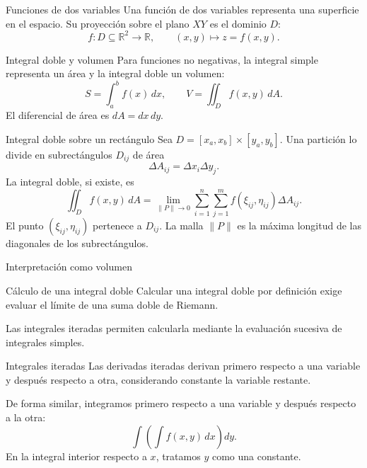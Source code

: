 \documentclass[main.tex]{subfiles}
\begin{document}
\graphicspath{{imagenes/tema5/}{../imagenes/tema5/}}



\begin{frame}{Funciones de dos variables}
Una función de dos variables representa una superficie en el espacio. Su proyección sobre el plano $XY$ es el dominio $D$:\[f:D\subseteq\mathbb R^2\longrightarrow\mathbb R,\qquad(x,y)\longmapsto z=f(x,y).\]
\end{frame}

\begin{frame}{Integral doble y volumen}
\small Para funciones no negativas, la integral simple representa un área y la integral doble un volumen:\[S=\int_a^bf(x)\,dx,\qquad V=\iint_Df(x,y)\,dA.\]El diferencial de área es $dA=dx\,dy$.
\end{frame}

\begin{frame}{Integral doble sobre un rectángulo}
\small Sea $D=[x_a,x_b]\times[y_a,y_b]$. Una partición lo divide en subrectángulos $D_{ij}$ de área\[\Delta A_{ij}=\Delta x_i\Delta y_j.\]La integral doble, si existe, es\[\boxed{\iint_Df(x,y)\,dA=\lim_{\|P\|\to0}\sum_{i=1}^n\sum_{j=1}^m f(\xi_{ij},\eta_{ij})\Delta A_{ij}.}\]El punto $(\xi_{ij},\eta_{ij})$ pertenece a $D_{ij}$. La malla $\|P\|$ es la máxima longitud de las diagonales de los subrectángulos.
\end{frame}

\begin{frame}{Interpretación como volumen}
\end{frame}

\begin{frame}{Cálculo de una integral doble}
Calcular una integral doble por definición exige evaluar el límite de una suma doble de Riemann.\par\medskip Las \alert{integrales iteradas} permiten calcularla mediante la evaluación sucesiva de integrales simples.
\end{frame}

\begin{frame}{Integrales iteradas}
Las derivadas iteradas derivan primero respecto a una variable y después respecto a otra, considerando constante la variable restante.\par\medskip De forma similar, integramos primero respecto a una variable y después respecto a la otra:\[\int\!\left(\int f(x,y)\,dx\right)dy.\]En la integral interior respecto a $x$, tratamos $y$ como una constante.
\end{frame}
\end{document}
